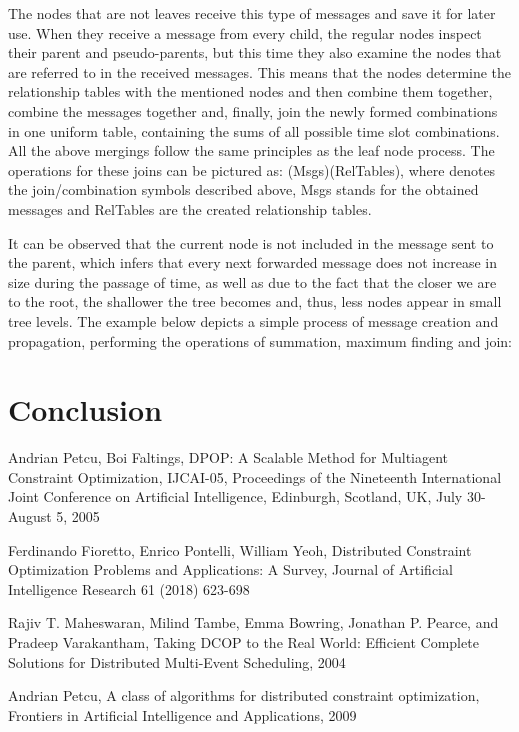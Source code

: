 \documentclass[11pt,a4paper,onecolumn]{article}
\begin{document}
	The nodes that are not leaves receive this type of messages and save it for later use. When they receive a message from every child, the regular nodes inspect their parent and pseudo-parents, but this time they also examine the nodes that are referred to in the received messages. This means that the nodes determine the relationship tables with the mentioned nodes and then combine them together, combine the messages together and, finally, join the newly formed combinations in one uniform table, containing the sums of all possible time slot combinations. All the above mergings follow the same principles as the leaf node process. The operations for these joins can be pictured as: ({Msgs})({RelTables}), where  denotes the join/combination symbols described above, Msgs stands for the obtained messages and RelTables are the created relationship tables.
	
	It can be observed that the current node is not included in the message sent to the parent, which infers that every next forwarded message does not increase in size during the passage of time, as well as due to the fact that the closer we are to the root, the shallower the tree becomes and, thus, less nodes appear in small tree levels. The example below depicts a simple process of message creation and propagation, performing the operations of summation, maximum finding and join:
	\section{Conclusion}

	
	\begin{thebibliography}{9}
Andrian Petcu, Boi Faltings, DPOP: A Scalable Method for Multiagent Constraint Optimization, IJCAI-05, Proceedings of the Nineteenth International Joint Conference on Artificial Intelligence, Edinburgh, Scotland, UK, July 30-August 5, 2005
	
Ferdinando Fioretto, Enrico Pontelli, William Yeoh, Distributed Constraint Optimization Problems and Applications: A Survey, Journal of Artificial Intelligence Research 61 (2018) 623-698
	
Rajiv T. Maheswaran, Milind Tambe, Emma Bowring, Jonathan P. Pearce, and Pradeep Varakantham, Taking DCOP to the Real World: Efficient Complete Solutions for Distributed Multi-Event Scheduling, 2004
	
Andrian Petcu, A class of algorithms for distributed constraint optimization, Frontiers in Artificial Intelligence and Applications, 2009
	
\end{thebibliography}
	
	
\end{document}
